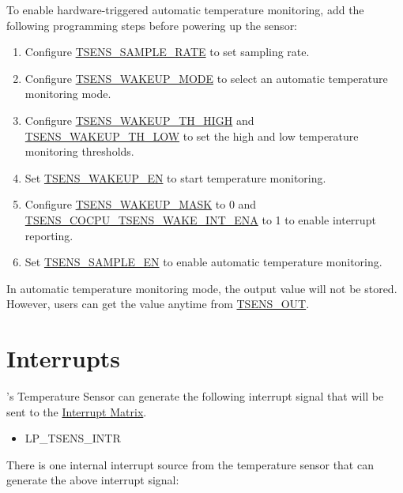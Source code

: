 \documentclass[main\_\_EN.tex]{subfiles}
\begin{document}
To enable hardware-triggered automatic temperature monitoring, add the following programming steps before powering up the sensor:

\begin{enumerate}
    \item Configure \hyperref[fielddesc:TSENSSAMPLERATE]{TSENS\_SAMPLE\_RATE} to set sampling rate.
    \item Configure \hyperref[fielddesc:TSENSWAKEUPMODE]{TSENS\_WAKEUP\_MODE} to select an automatic temperature monitoring mode.
    \item Configure \hyperref[fielddesc:TSENSWAKEUPTHHIGH]{TSENS\_WAKEUP\_TH\_HIGH} and \hyperref[fielddesc:TSENSWAKEUPTHLOW]{TSENS\_WAKEUP\_TH\_LOW} to set the high and low temperature monitoring thresholds.
    \item Set \hyperref[fielddesc:TSENSWAKEUPEN]{TSENS\_WAKEUP\_EN} to start temperature monitoring.
    \item Configure \hyperref[fielddesc:TSENSWAKEUPMASK]{TSENS\_WAKEUP\_MASK} to 0 and \hyperref[fielddesc:TSENSCOCPUTSENSWAKEINTENA]{TSENS\_COCPU\_TSENS\_WAKE\_INT\_ENA} to 1 to enable interrupt reporting.
    \item Set \hyperref[fielddesc:TSENSSAMPLEEN]{TSENS\_SAMPLE\_EN} to enable automatic temperature monitoring.
\end{enumerate}

In automatic temperature monitoring mode, the output value will not be stored. However, users can get the value anytime from \hyperref[fielddesc:TSENSOUT]{TSENS\_OUT}.

\section{Interrupts}

\chipname{}'s Temperature Sensor can generate the following interrupt signal that will be sent to the \hyperref[mod:intmtrx]{Interrupt Matrix}.

\begin{itemize}
    \item LP\_TSENS\_INTR
\end{itemize}

There is one internal interrupt source from the temperature sensor that can generate the above interrupt signal:
\end{document}
